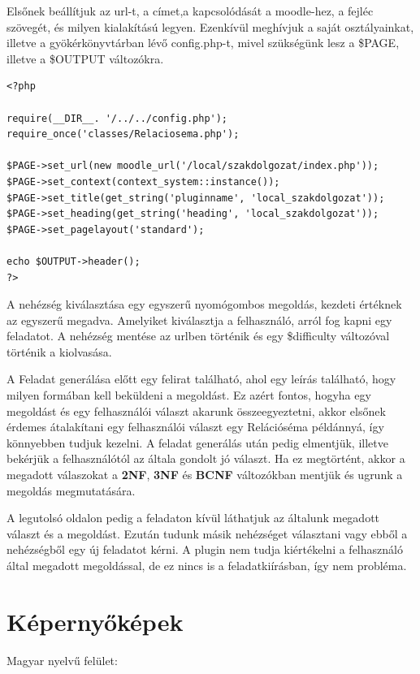 Elsőnek beállítjuk az url-t, a címet,a kapcsolódását a moodle-hez, a fejléc szövegét, és milyen kialakítású legyen.
Ezenkívül meghívjuk a saját osztályainkat, illetve a gyökérkönyvtárban lévő config.php-t, mivel szükségünk lesz a \$PAGE, illetve a \$OUTPUT változókra. 
\begin{lstlisting}
<?php

require(__DIR__. '/../../config.php');
require_once('classes/Relaciosema.php');

$PAGE->set_url(new moodle_url('/local/szakdolgozat/index.php'));
$PAGE->set_context(context_system::instance());
$PAGE->set_title(get_string('pluginname', 'local_szakdolgozat'));
$PAGE->set_heading(get_string('heading', 'local_szakdolgozat'));
$PAGE->set_pagelayout('standard');

echo $OUTPUT->header();
?>
\end{lstlisting}

A nehézség kiválasztása egy egyszerű nyomógombos megoldás, kezdeti értéknek az egyszerű megadva. Amelyiket kiválasztja a felhasználó, arról fog kapni egy feladatot. A nehézség mentése az urlben történik és egy \$difficulty változóval történik a kiolvasása. \par

A Feladat generálása előtt egy felirat található, ahol egy leírás található, hogy milyen formában kell beküldeni a megoldást. Ez azért fontos, hogyha egy megoldást és egy felhasználói választ akarunk összeegyeztetni, akkor elsőnek érdemes átalakítani egy felhasználói választ egy Relációséma példánnyá, így könnyebben tudjuk kezelni. A feladat generálás után pedig elmentjük, illetve bekérjük a felhasználótól az általa gondolt jó választ. Ha ez megtörtént, akkor a megadott válaszokat a \textbf{2NF}, \textbf{3NF} és \textbf{BCNF} változókban mentjük és ugrunk a megoldás megmutatására.\par

A legutolsó oldalon pedig a feladaton kívül láthatjuk az általunk megadott választ és a megoldást. Ezután tudunk másik nehézséget választani vagy ebből a nehézségből egy új feladatot kérni. A plugin nem tudja kiértékelni a felhasználó által megadott megoldással, de ez nincs is a feladatkiírásban, így nem probléma. \par

\section{Képernyőképek}

Magyar nyelvű felület:

